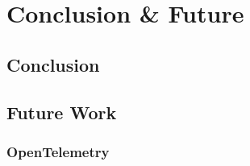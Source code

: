 \documentclass[12pt,pdftex,titlepage]{report}
\begin{document}
    
    \chapter{Conclusion \& Future}
        \section{Conclusion}

        \section{Future Work}
            \subsection{OpenTelemetry}
\end{document}
